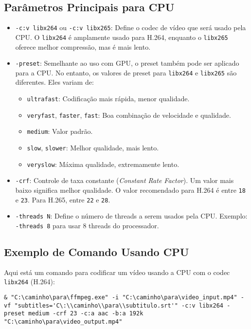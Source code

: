 \documentclass{article}
\begin{document}
\subsection{Parâmetros Principais para CPU}

\begin{itemize}
    \item \texttt{-c:v libx264} ou \texttt{-c:v libx265}: Define o codec de vídeo que será usado pela CPU. O \texttt{libx264} é amplamente usado para H.264, enquanto o \texttt{libx265} oferece melhor compressão, mas é mais lento.
    
    \item \texttt{-preset}: Semelhante ao uso com GPU, o preset também pode ser aplicado para a CPU. No entanto, os valores de preset para \texttt{libx264} e \texttt{libx265} são diferentes. Eles variam de:
    \begin{itemize}
        \item \texttt{ultrafast}: Codificação mais rápida, menor qualidade.
        \item \texttt{veryfast}, \texttt{faster}, \texttt{fast}: Boa combinação de velocidade e qualidade.
        \item \texttt{medium}: Valor padrão.
        \item \texttt{slow}, \texttt{slower}: Melhor qualidade, mais lento.
        \item \texttt{veryslow}: Máxima qualidade, extremamente lento.
    \end{itemize}
    
    \item \texttt{-crf}: Controle de taxa constante (\textit{Constant Rate Factor}). Um valor mais baixo significa melhor qualidade. O valor recomendado para H.264 é entre \texttt{18} e \texttt{23}. Para H.265, entre \texttt{22} e \texttt{28}.
    
    \item \texttt{-threads N}: Define o número de threads a serem usados pela CPU. Exemplo: \texttt{-threads 8} para usar 8 threads do processador.
\end{itemize}

\subsection{Exemplo de Comando Usando CPU}

Aqui está um comando para codificar um vídeo usando a CPU com o codec \texttt{libx264} (H.264):

\begin{lstlisting}
& "C:\caminho\para\ffmpeg.exe" -i "C:\caminho\para\video_input.mp4" -vf "subtitles='C\:\\caminho\\para\\subtitulo.srt'" -c:v libx264 -preset medium -crf 23 -c:a aac -b:a 192k "C:\caminho\para\video_output.mp4"
\end{lstlisting}
\end{document}

